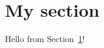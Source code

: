 \documentclass{article}
\begin{document}
\section{My section}
\label{sec:ms}
Hello from Section~\ref{sec:ms}!
\end{document}
